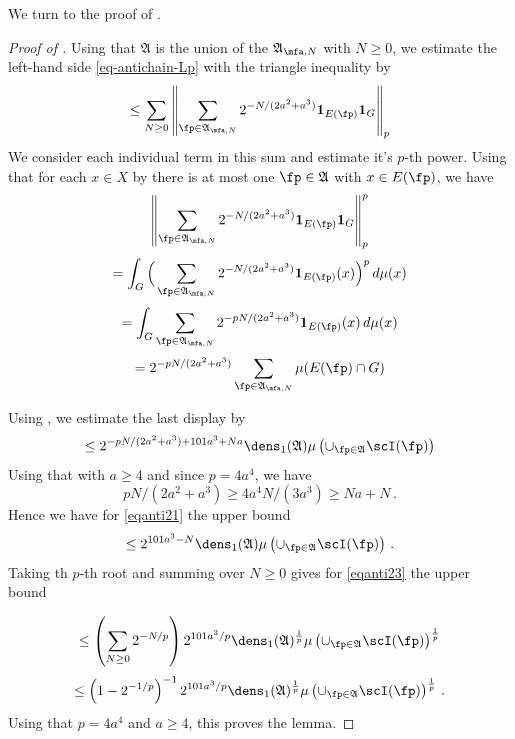 We turn to the proof of .

\begin{proof}[Proof of ]

Using that $\mathfrak{A}$ is the union of the
$\mathfrak{A}_{\mfa,N}$ with $N\ge 0$,
we estimate the left-hand side \eqref{eq-antichain-Lp}
with the triangle inequality by
\begin{equation}\label{eqanti23}
\le \sum_{N\ge 0} \left\|\sum_{\fp\in \mathfrak{A}_{\mfa,N}} 2^{-N/(2a^2+a^3)}\mathbf{1}_{E(\fp)} \mathbf{1}_G\right\|_{p}
\end{equation}
We consider each individual term in this sum and estimate it's $p$-th power.
   Using that for each $x\in X$ by  there is at most one $\fp\in \mathfrak{A}$ with $x\in E(\fp)$,
 we have
 \begin{equation}
     \left\|\sum_{\fp\in \mathfrak{A}_{\mfa,N}} 2^{-N/(2a^2+a^3)}\mathbf{1}_{E(\fp)} \mathbf{1}_G\right\|_{p}^p
 \end{equation}
\begin{equation}
    =\int_G\Big(\sum_{\fp\in \mathfrak{A}_{\mfa,N}}2^{-N/(2a^2+a^3)}\mathbf{1}_{E(\fp)}(x)\Big)^p\, d\mu(x)
\end{equation}
\begin{equation}
  = \int _G\sum_{\fp\in\mathfrak{A}_{\mfa,N}}2^{-pN/(2a^2+a^3)}\mathbf{1}_{E(\fp)}(x)\, d\mu(x)
\end{equation}
\begin{equation}
  = 2^{-pN/(2a^2+a^3)} \sum_{\fp\in\mathfrak{A}_{\mfa,N}}\mu(E(\fp)\cap G)
\end{equation}

Using , we estimate the last display by
\begin{equation}\label{eqanti21}
    \le 2^{-pN/(2a^2+a^3)+101a^3+Na}\dens_1(\mathfrak{A})\mu\left(\cup_{\fp\in\mathfrak{A}}\scI(\fp)\right)
\end{equation}
Using that with $a\ge 4$ and since $p = 4a^4$, we have
\begin{equation}
    pN/(2a^2+a^3)\ge
    4a^4N/(3a^3) \ge Na+N\, .
\end{equation}
Hence we have for \eqref{eqanti21} the upper bound
\begin{equation}\label{eqanti22}
\le 2^{101a^3-N}\dens_1(\mathfrak{A})\mu\left(\cup_{\fp\in\mathfrak{A}}\scI(\fp)\right)\, .
\end{equation}
Taking th $p$-th root and summing over $N\ge 0$ gives for \eqref{eqanti23} the upper bound

\begin{equation}
\le \left(\sum_{N\ge 0} 2^{-N/p}\right)2^{101a^3/p}\dens_1(\mathfrak{A})^{{\frac{1}{p}}}\mu\left(\cup_{\fp\in\mathfrak{A}}\scI(\fp)\right)^{{\frac{1}{p}}}
\end{equation}
\begin{equation}
\le \left(1-2^{-1/p}\right)^{-1}
2^{101a^3/p}
\dens_1(\mathfrak{A})^{\frac 1p}\mu\left(\cup_{\fp\in\mathfrak{A}}\scI(\fp)\right)^{\frac 1p}\, .
\end{equation}
Using that $p = 4a^4$ and $a \ge 4$, this proves the lemma.
\end{proof}

